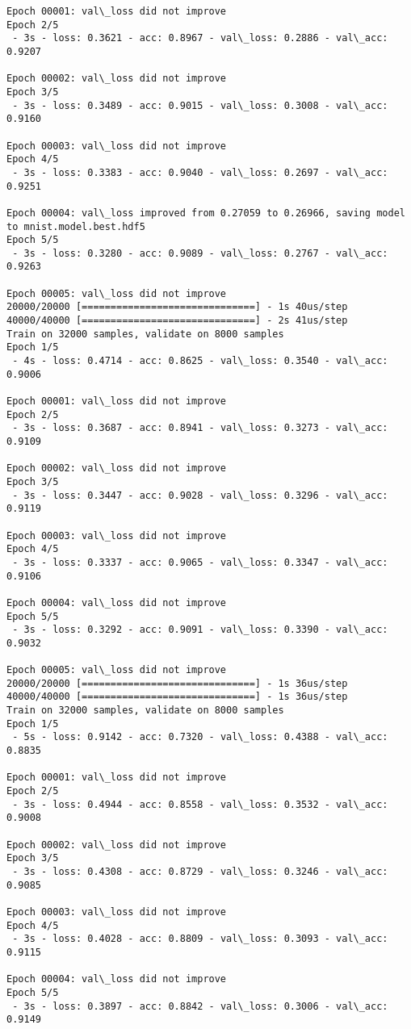 \documentclass[11pt]{article}
\begin{document}
\begin{Verbatim}[commandchars=\\\{\}]
Epoch 00001: val\_loss did not improve
Epoch 2/5
 - 3s - loss: 0.3621 - acc: 0.8967 - val\_loss: 0.2886 - val\_acc: 0.9207

Epoch 00002: val\_loss did not improve
Epoch 3/5
 - 3s - loss: 0.3489 - acc: 0.9015 - val\_loss: 0.3008 - val\_acc: 0.9160

Epoch 00003: val\_loss did not improve
Epoch 4/5
 - 3s - loss: 0.3383 - acc: 0.9040 - val\_loss: 0.2697 - val\_acc: 0.9251

Epoch 00004: val\_loss improved from 0.27059 to 0.26966, saving model to mnist.model.best.hdf5
Epoch 5/5
 - 3s - loss: 0.3280 - acc: 0.9089 - val\_loss: 0.2767 - val\_acc: 0.9263

Epoch 00005: val\_loss did not improve
20000/20000 [==============================] - 1s 40us/step
40000/40000 [==============================] - 2s 41us/step
Train on 32000 samples, validate on 8000 samples
Epoch 1/5
 - 4s - loss: 0.4714 - acc: 0.8625 - val\_loss: 0.3540 - val\_acc: 0.9006

Epoch 00001: val\_loss did not improve
Epoch 2/5
 - 3s - loss: 0.3687 - acc: 0.8941 - val\_loss: 0.3273 - val\_acc: 0.9109

Epoch 00002: val\_loss did not improve
Epoch 3/5
 - 3s - loss: 0.3447 - acc: 0.9028 - val\_loss: 0.3296 - val\_acc: 0.9119

Epoch 00003: val\_loss did not improve
Epoch 4/5
 - 3s - loss: 0.3337 - acc: 0.9065 - val\_loss: 0.3347 - val\_acc: 0.9106

Epoch 00004: val\_loss did not improve
Epoch 5/5
 - 3s - loss: 0.3292 - acc: 0.9091 - val\_loss: 0.3390 - val\_acc: 0.9032

Epoch 00005: val\_loss did not improve
20000/20000 [==============================] - 1s 36us/step
40000/40000 [==============================] - 1s 36us/step
Train on 32000 samples, validate on 8000 samples
Epoch 1/5
 - 5s - loss: 0.9142 - acc: 0.7320 - val\_loss: 0.4388 - val\_acc: 0.8835

Epoch 00001: val\_loss did not improve
Epoch 2/5
 - 3s - loss: 0.4944 - acc: 0.8558 - val\_loss: 0.3532 - val\_acc: 0.9008

Epoch 00002: val\_loss did not improve
Epoch 3/5
 - 3s - loss: 0.4308 - acc: 0.8729 - val\_loss: 0.3246 - val\_acc: 0.9085

Epoch 00003: val\_loss did not improve
Epoch 4/5
 - 3s - loss: 0.4028 - acc: 0.8809 - val\_loss: 0.3093 - val\_acc: 0.9115

Epoch 00004: val\_loss did not improve
Epoch 5/5
 - 3s - loss: 0.3897 - acc: 0.8842 - val\_loss: 0.3006 - val\_acc: 0.9149


\end{Verbatim}
\end{document}
